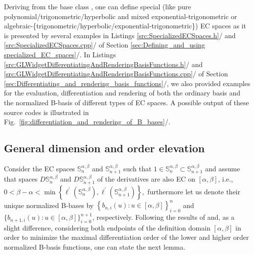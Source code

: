 \documentclass[b5paper, twosided]{book}
\newcommand{\CRed}[1]{{\color[rgb]{0.5, 0.0, 0.0}{#1}}}
\newcommand{\CBlue}[1]{{\color[rgb]{0.0, 0.0, 0.9}{#1}}}
\DeclareRobustCommand{\mref}[1]{\ref{#1}{\relsize{-1}/\pageref{#1}}}
\begin{document}
\bigskip{}

\noindent{}\CRed{\textbf{Examples to consider.}} Deriving from the base class \CBlue{ECSpace}, one can define special (like pure poly\-no\-mi\-al/trig\-o\-no\-met\-ric/hyperbolic and mixed exponential-trigonometric or algebraic-\{trig\-o\-no\-met\-ric/hy\-per\-bo\-lic/ex\-po\-nen\-tial-trigonometric\}) EC spaces as it is presented by several examples in Listings \mref{src:SpecializedECSpaces.h} and \mref{src:SpecializedECSpaces.cpp} of Section \mref{sec:Defining_and_using specialized_EC_spaces}. In Listings \mref{src:GLWidgetDifferentiatingAndRenderingBasisFunctions.h} and \mref{src:GLWidgetDifferentiatingAndRenderingBasisFunctions.cpp} of Section \mref{sec:Differentiating_and_rendering_basis_functions}, we also provided examples for the evaluation, differentiation and rendering of both the ordinary basis and the normalized B-basis of different types of EC spaces. A possible output of these source codes is illustrated in Fig.\ \mref{fig:differentiation_and_rendering_of_B_bases}.



\subsection{General dimension and order elevation}

Consider the EC spaces $\mathbb{S}_n^{\alpha,\beta}$ and $\mathbb{S}_{n+1}^{\alpha,\beta}$ such that $1\in \mathbb{S}_n^{\alpha,\beta} \subset \mathbb{S}_{n+1}^{\alpha,\beta}$ and assume that spaces $D\mathbb{S}_{n}^{\alpha,\beta}$ and $D\mathbb{S}_{n+1}^{\alpha,\beta}$ of the derivatives are also EC on $\left[\alpha,\beta\right]$, i.e., $
0<\beta-\alpha<\min\left\{\ell^{\prime}\left(\mathbb{S}_{n}^{\alpha,\beta}\right),\ell^{\prime}\left(\mathbb{S}_{n+1}^{\alpha,\beta}\right)\right\},
$
furthermore let us denote their unique normalized B-bases by $\left\{b_{n,i}\left(u\right):u\in\left[\alpha,\beta\right]\right\}_{i=0}^n$ and $\big\{b_{n+1,i}\left(u\right):u\in\left[\alpha,\beta\right]\big\}_{i=0}^{n+1}$, respectively. Following the results of \cite[Theorem 3.1]{MazureLaurent1998} and, as a slight difference, considering both endpoints of the definition domain $\left[\alpha, \beta\right]$ in order to minimize the maximal differentiation order of the lower and higher order normalized B-basis functions, one can state the next lemma.
\end{document}
